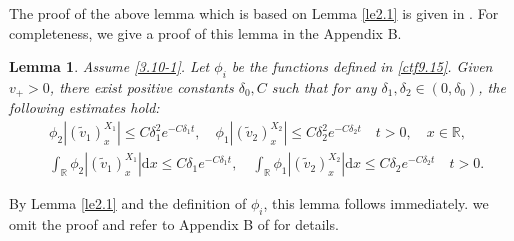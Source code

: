 \documentclass[10pt,reqno]{amsart}
\numberwithin{equation}{section}
\newtheorem{lemma}[theorem]{Lemma}
\newcommand{\dif}{\mathrm{d}}
\begin{document}
The proof of the above lemma which is based on Lemma \ref{le2.1} is given in \cite{SMJ}. For completeness, we give a proof of this lemma in the Appendix B.


\begin{lemma}\label{ctf9.151}
Assume \eqref{3.10-1}. Let $\phi_i$ be the functions defined in \eqref{ctf9.15}. Given $v_+>0$, there exist positive constants $\delta_0,C$ such that for any $\delta_1,\delta_2\in(0,\delta_0)$, the following estimates hold:
\begin{align*}
&\phi_2|(\widetilde{v}_1)_x^{X_1}|\le C\delta_1^2e^{-C\delta_1t},\quad
\phi_1|(\widetilde{v}_2)_x^{X_2}|\le C\delta_2^2e^{-C\delta_2t}
\quad t>0, \quad x\in \mathbb{R},\\
&\int_\mathbb{R}\phi_2|(\widetilde{v}_1)_x^{X_1}|\dif x\le C\delta_1e^{-C\delta_1t},\quad
\int_\mathbb{R}\phi_1|(\widetilde{v}_2)_x^{X_2}|\dif x\le C\delta_2e^{-C\delta_2t}
\quad t>0.
\end{align*}
\end{lemma}
By Lemma \ref{le2.1} and the definition of $\phi_i$, this lemma follows immediately. we omit the proof and refer to Appendix B of \cite{SMJ} for details.
\end{document}
